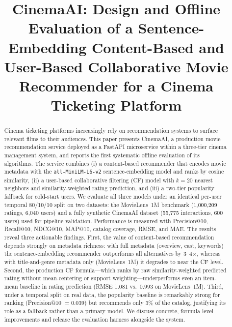 \documentclass[conference]{IEEEtran}
\begin{document}
\title{CinemaAI: Design and Offline Evaluation of a Sentence-Embedding
Content-Based and User-Based Collaborative Movie Recommender for a Cinema
Ticketing Platform}

\author{
}

\maketitle

\begin{abstract}
Cinema ticketing platforms increasingly rely on recommendation systems to
surface relevant films to their audiences. This paper presents CinemaAI, a
production movie recommendation service deployed as a FastAPI microservice
within a three-tier cinema management system, and reports the first systematic
offline evaluation of its algorithms. The service combines (i) a content-based
recommender that encodes movie metadata with the \texttt{all-MiniLM-L6-v2}
sentence-embedding model and ranks by cosine similarity, (ii) a user-based
collaborative filtering (CF) model with $k=20$ nearest neighbors and
similarity-weighted rating prediction, and (iii) a two-tier popularity fallback
for cold-start users. We evaluate all three models under an identical per-user
temporal 80/10/10 split on two datasets: the MovieLens~1M benchmark (1{,}000{,}209
ratings, 6{,}040 users) and a fully synthetic CinemaAI dataset (55{,}775
interactions, 600 users) used for pipeline validation. Performance is measured
with Precision@10, Recall@10, NDCG@10, MAP@10, catalog coverage, RMSE, and MAE.
The results reveal three actionable findings. First, the value of content-based
recommendation depends strongly on metadata richness: with full metadata
(overview, cast, keywords) the sentence-embedding recommender outperforms all
alternatives by 3--4$\times$, whereas with title-and-genre metadata only
(MovieLens~1M) it degrades to near the CF level. Second, the production CF
formula---which ranks by raw similarity-weighted predicted rating without
mean-centering or support weighting---underperforms even an item-mean baseline
in rating prediction (RMSE 1.081 vs.\ 0.993 on MovieLens~1M). Third, under a
temporal split on real data, the popularity baseline is remarkably strong for
ranking (Precision@10 $=0.039$) but recommends only 3\% of the catalog,
justifying its role as a fallback rather than a primary model. We discuss
concrete, formula-level improvements and release the evaluation harness
alongside the system.
\end{abstract}
\end{document}
